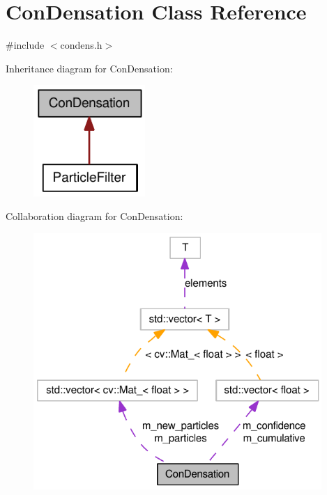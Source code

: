 \hypertarget{classConDensation}{
\section{ConDensation Class Reference}
\label{classConDensation}
}


{\ttfamily \#include $<$condens.h$>$}



Inheritance diagram for ConDensation:\nopagebreak
\begin{figure}[H]
\begin{center}
\leavevmode
\includegraphics[width=120pt]{classConDensation__inherit__graph}
\end{center}
\end{figure}


Collaboration diagram for ConDensation:\nopagebreak
\begin{figure}[H]
\begin{center}
\leavevmode
\includegraphics[width=310pt]{classConDensation__coll__graph}
\end{center}
\end{figure}
